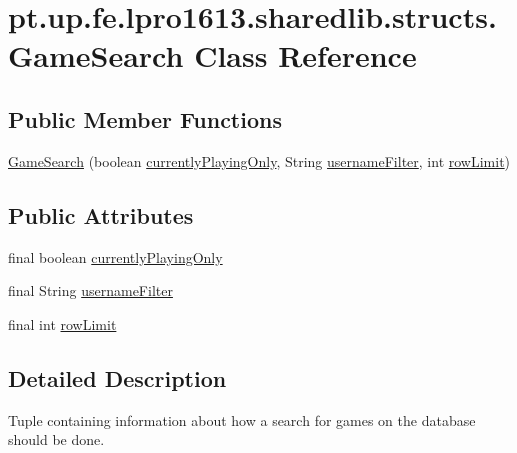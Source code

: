 \hypertarget{classpt_1_1up_1_1fe_1_1lpro1613_1_1sharedlib_1_1structs_1_1_game_search}{}\section{pt.\+up.\+fe.\+lpro1613.\+sharedlib.\+structs.\+Game\+Search Class Reference}
\label{classpt_1_1up_1_1fe_1_1lpro1613_1_1sharedlib_1_1structs_1_1_game_search}
\subsection*{Public Member Functions}
\begin{DoxyCompactItemize}
\item 
\hyperlink{classpt_1_1up_1_1fe_1_1lpro1613_1_1sharedlib_1_1structs_1_1_game_search_ab6fd8a05a11c13040f547e61f1010af0}{Game\+Search} (boolean \hyperlink{classpt_1_1up_1_1fe_1_1lpro1613_1_1sharedlib_1_1structs_1_1_game_search_a5e93514e466b4c5742b7d639c7d8412d}{currently\+Playing\+Only}, String \hyperlink{classpt_1_1up_1_1fe_1_1lpro1613_1_1sharedlib_1_1structs_1_1_game_search_af33050364c5b316349ab7a1fabce9206}{username\+Filter}, int \hyperlink{classpt_1_1up_1_1fe_1_1lpro1613_1_1sharedlib_1_1structs_1_1_game_search_a700879797ed322ef8f064e6656622d5f}{row\+Limit})
\end{DoxyCompactItemize}
\subsection*{Public Attributes}
\begin{DoxyCompactItemize}
\item 
final boolean \hyperlink{classpt_1_1up_1_1fe_1_1lpro1613_1_1sharedlib_1_1structs_1_1_game_search_a5e93514e466b4c5742b7d639c7d8412d}{currently\+Playing\+Only}
\item 
final String \hyperlink{classpt_1_1up_1_1fe_1_1lpro1613_1_1sharedlib_1_1structs_1_1_game_search_af33050364c5b316349ab7a1fabce9206}{username\+Filter}
\item 
final int \hyperlink{classpt_1_1up_1_1fe_1_1lpro1613_1_1sharedlib_1_1structs_1_1_game_search_a700879797ed322ef8f064e6656622d5f}{row\+Limit}
\end{DoxyCompactItemize}


\subsection{Detailed Description}
Tuple containing information about how a search for games on the database should be done.

